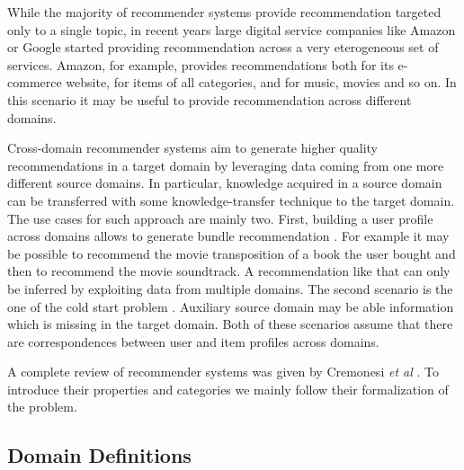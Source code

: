 While the majority of recommender systems provide recommendation targeted only to a single topic, in recent years large digital service companies like Amazon or Google started providing recommendation across a very eterogeneous set of services. Amazon, for example, provides recommendations both for its e-commerce website, for items of all categories, and for music, movies and so on. In this scenario it may be useful to provide recommendation across different domains.\par
Cross-domain recommender systems aim to generate higher quality recommendations in a target domain by leveraging data coming from one more different source domains. In particular, knowledge acquired in a source domain can be transferred with some knowledge-transfer technique to the target domain.\\
The use cases for such approach are mainly two. First, building a user profile across domains allows to generate bundle recommendation \cite{10.1007/s11257-012-9131-2, 10.1007/s11257-007-9042-9, 10.1007/s11257-012-9128-x}. For example it may be possible to recommend the movie transposition of a book the user bought and then to recommend the movie soundtrack. A recommendation like that can only be inferred by exploiting data from multiple domains. The second scenario is the one of the cold start problem \cite{10.1145/2645710.2645777, 10.1007/978-3-642-22362-4_26, 10.1145/2507157.2507206}. Auxiliary source domain may be able information which is missing in the target domain. Both of these scenarios assume that there are correspondences between user and item profiles across domains.\par
A complete review of recommender systems was given by Cremonesi \textit{et al} \cite{10.1007/978-1-4899-7637-6_27}. To introduce their properties and categories we mainly follow their formalization of the problem.


\subsection{Domain Definitions}


